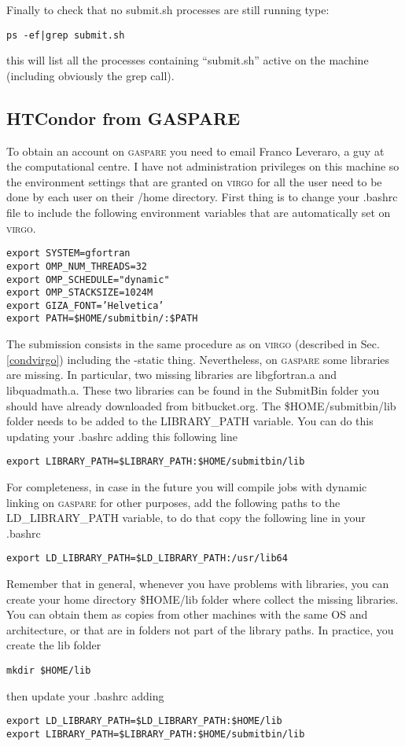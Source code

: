 \documentclass[10pt,a4paper,twoside]{article} %
\begin{document}
Finally to check that no submit.sh processes are still running type:
\begin{verbatim}
ps -ef|grep submit.sh
\end{verbatim}
this will list all the processes containing ``submit.sh'' active on the machine (including obviously the grep call).

\subsection{HTCondor from GASPARE}

To obtain an account on \textsc{gaspare} you need to email Franco Leveraro, a guy at the computational centre.
I have not administration privileges on this machine so the environment settings that are granted on \textsc{virgo} for all the user need to be done by each user on their /home directory. First thing is to change your .bashrc file to include the following environment variables that are automatically set on \textsc{virgo}. 
\begin{verbatim}
export SYSTEM=gfortran
export OMP_NUM_THREADS=32
export OMP_SCHEDULE="dynamic"
export OMP_STACKSIZE=1024M
export GIZA_FONT=’Helvetica’
export PATH=$HOME/submitbin/:$PATH
\end{verbatim}

The submission consists in the same procedure as on \textsc{virgo} (described in Sec. \ref{condvirgo}) including the -static thing. Nevertheless, on \textsc{gaspare} some libraries are missing. In particular, two missing libraries are libgfortran.a and libquadmath.a. These two libraries can be found in the SubmitBin folder you should have already downloaded from bitbucket.org. The \$HOME/submitbin/lib folder needs to be added to the LIBRARY\_PATH variable. You can do this updating your .bashrc adding this following line
\begin{verbatim}
export LIBRARY_PATH=$LIBRARY_PATH:$HOME/submitbin/lib
\end{verbatim}
For completeness, in case in the future you will compile jobs with dynamic linking on \textsc{gaspare} for other purposes, add the following paths to the LD\_LIBRARY\_PATH variable, to do that copy the following line in your .bashrc 
\begin{verbatim}
export LD_LIBRARY_PATH=$LD_LIBRARY_PATH:/usr/lib64
\end{verbatim}

Remember that in general, whenever you have problems with libraries, you can create your home directory \$HOME/lib folder where collect the missing libraries. You can obtain them as copies from other machines with the same OS and architecture, or that are in folders not part of the library paths. In practice, you create the lib folder
\begin{verbatim}
mkdir $HOME/lib
\end{verbatim}
then update your .bashrc adding
\begin{verbatim}
export LD_LIBRARY_PATH=$LD_LIBRARY_PATH:$HOME/lib
export LIBRARY_PATH=$LIBRARY_PATH:$HOME/submitbin/lib
\end{verbatim}
\end{document}
